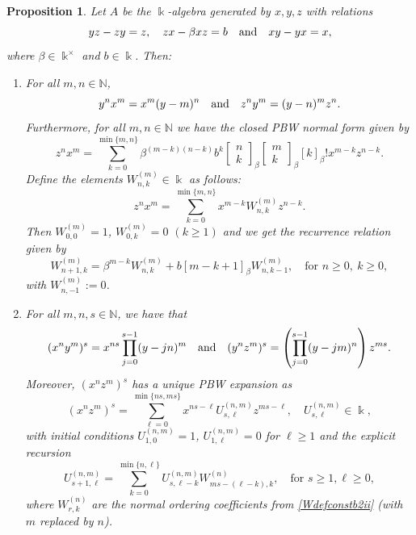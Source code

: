 \documentclass{amsart}
\newtheorem{proposition}[theorem]{Proposition}
\theoremstyle{definition}
\theoremstyle{remark}
\numberwithin{equation}{section}
\begin{document}
\begin{proposition}\label{case(2)(ii)}
Let $A$ be the $\Bbbk$-algebra generated by $x,y,z$ with relations
\[
yz - zy = z, \quad zx - \beta xz = b \quad {\rm and} \quad xy - yx = x,
\]
where $\beta\in\Bbbk^{\times}$ and $b\in\Bbbk$. Then:
\begin{enumerate}
\item [\rm (1)] For all $m,n\in\mathbb{N}$,
\[
y^n x^m = x^m (y-m)^n \quad {\rm and}\quad z^n y^m = (y-n)^m z^n.
\]
Furthermore, for all $m,n\in\mathbb{N}$ we have the closed PBW normal form given by
\begin{equation}\label{znxmclosedconstb2ii}
z^n x^m = \sum_{k=0}^{\min\{m,n\}}
\beta^{(m-k)(n-k)}b^k\begin{bmatrix} n\\ k\end{bmatrix}_{\beta}\begin{bmatrix} m\\ k\end{bmatrix}_{\beta}[k]_{\beta}!x^{m-k}z^{n-k}.
\end{equation}
Define the elements $W^{(m)}_{n,k}\in\Bbbk$ as follows: 
\begin{equation}\label{Wdefconstb2ii}
z^n x^m = \sum_{k=0}^{\min\{m,n\}} x^{m-k}W^{(m)}_{n,k}z^{n-k}.
\end{equation}
Then $W^{(m)}_{0,0}=1$, $W^{(m)}_{0,k}=0$ $(k\ge 1)$ and we get the recurrence relation given by
\begin{equation}\label{Wrecconstb2ii}
W^{(m)}_{n+1,k}=\beta^{m-k}W^{(m)}_{n,k}+b[m-k+1]_{\beta}W^{(m)}_{n,k-1}, \quad  \text{for } n\ge 0,\ k\ge 0,
\end{equation}
with $W^{(m)}_{n,-1}:=0$.

\item [\rm (2)] For all $m, n, s \in \mathbb{N}$, we have that
\[
(x^n y^m)^s = x^{ns}\prod_{j=0}^{s-1}(y-jn)^m \quad {\rm and} \quad (y^n z^m)^s = \left(\prod_{j=0}^{s-1}(y-jm)^n\right)z^{ms}.
\]
Moreover, $(x^n z^m)^s$ has a unique PBW expansion as 
\begin{equation}\label{xnzmUconstb2ii}
(x^n z^m)^s = \sum_{\ell=0}^{\min\{ns,ms\}} x^{ns -\ell}U^{(n,m)}_{s,\ell}z^{ms-\ell}, \quad U^{(n,m)}_{s,\ell}\in\Bbbk,
\end{equation}
with initial conditions $U^{(n,m)}_{1,0}=1$, $U^{(n,m)}_{1,\ell}=0$ for $\ell\ge 1$ and the explicit recursion
\begin{equation}\label{Urecconstb2ii}
U^{(n,m)}_{s+1,\ell} = \sum_{k=0}^{\min\{n,\ell\}}U^{(n,m)}_{s,\ell-k}W^{(n)}_{ms-(\ell-k),k}, \quad \text{for } s\ge 1, \ell\ge 0,
\end{equation}
where $W^{(n)}_{r,k}$ are the normal ordering coefficients from \eqref{Wdefconstb2ii} {\rm (}with $m$ replaced by $n${\rm )}.


\end{enumerate}
\end{proposition}
\end{document}
